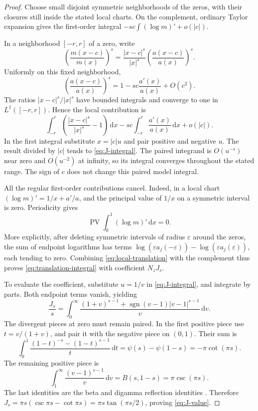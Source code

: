 \documentclass[11pt,a4paper]{article}
\numberwithin{equation}{section}
\theoremstyle{definition}
\theoremstyle{remark}
\newcommand{\dd}{\,\mathrm d}
\newcommand{\PV}{\operatorname{PV}}
\begin{document}
\begin{proof}
Choose small disjoint symmetric neighborhoods of the zeros, with their
closures still inside the stated local charts. On the complement,
ordinary Taylor expansion gives the first-order integral
$-sc\int (\log m)' +o(|c|)$.

In a neighborhood $[-r,r]$ of a zero, write
\[
 \left(\frac{m(x-c)}{m(x)}\right)^s
 =\frac{|x-c|^s}{|x|^s}
 \left(\frac{a(x-c)}{a(x)}\right)^s.
\]
Uniformly on this fixed neighborhood,
\[
 \left(\frac{a(x-c)}{a(x)}\right)^s
 =1-sc\frac{a'(x)}{a(x)}+O(c^2).
\]
The ratios $|x-c|^s/|x|^s$ have bounded integrals and converge to one in
$L^1([-r,r])$. Hence the local contribution is
\begin{equation}
 \int_{-r}^{r}\left(\frac{|x-c|^s}{|x|^s}-1\right)\dd x
 -sc\int_{-r}^{r}\frac{a'(x)}{a(x)}\dd x+o(|c|).
 \label{eq:local-translation}
\end{equation}
In the first integral substitute $x=|c|u$ and pair positive and negative
$u$. The result divided by $|c|$ tends to \cref{eq:J-integral}.
The paired integrand is $O(u^{-s})$ near zero and $O(u^{-2})$ at
infinity, so its integral converges throughout the stated range.
The sign of $c$ does not change this paired model integral.

All the regular first-order contributions cancel. Indeed, in a local
chart $(\log m)'=1/x+a'/a$, and the principal value of $1/x$ on a
symmetric interval is zero. Periodicity gives
\[
 \PV\int_0^1(\log m)'\dd x=0.
\]
More explicitly, after deleting symmetric intervals of radius
$\varepsilon$ around the zeros, the sum of endpoint logarithms has
terms $\log(\varepsilon a_j(-\varepsilon))-
\log(\varepsilon a_j(\varepsilon))$, each tending to zero.
Combining \cref{eq:local-translation} with the complement thus proves
\cref{eq:translation-integral} with coefficient $N_zJ_s$.

To evaluate the coefficient, substitute $u=1/v$ in
\cref{eq:J-integral}, and integrate by parts. Both endpoint terms
vanish, yielding
\begin{equation}
 \frac{J_s}{s}=
 \int_0^\infty
 \frac{(1+v)^{s-1}+\operatorname{sgn}(v-1)|v-1|^{s-1}}{v}\dd v.
 \label{eq:J-parts}
\end{equation}
The divergent pieces at zero must remain paired. In the first positive
piece use $t=v/(1+v)$, and pair it with the negative piece on $(0,1)$.
Their sum is
\[
 \int_0^1\frac{(1-t)^{-s}-(1-t)^{s-1}}{t}\dd t
 =\psi(s)-\psi(1-s)=-\pi\cot(\pi s).
\]
The remaining positive piece is
\[
 \int_1^\infty\frac{(v-1)^{s-1}}{v}\dd v
 =B(s,1-s)=\pi\csc(\pi s).
\]
The last identities are the beta and digamma reflection identities
\cite[\S5.5]{DLMF}. Therefore
$J_s=\pi s(\csc\pi s-\cot\pi s)
=\pi s\tan(\pi s/2)$, proving \cref{eq:J-value}.
\end{proof}
\end{document}
